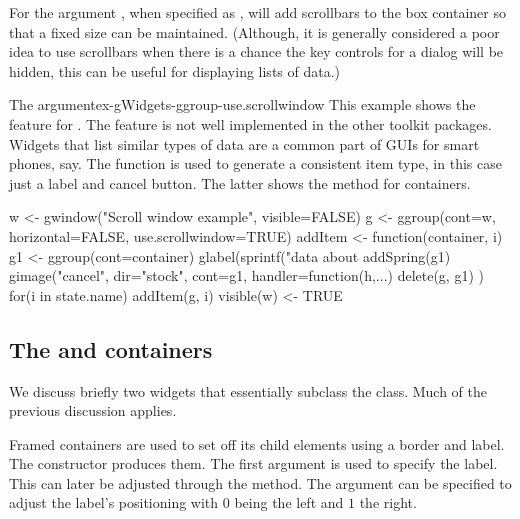 For  the argument
, when specified as , will
add scrollbars to the box container so that a fixed size can be
maintained. (Although, it is generally considered a poor idea to use
scrollbars when there is a chance the key controls for a dialog will
be hidden, this can be useful for displaying lists of data.)


\begin{example}{The  argument}{ex-gWidgets-ggroup-use.scrollwindow}
This example shows the  feature for
. The feature is not well implemented in the other
toolkit packages. Widgets that list similar types of data are a common
part of GUIs for smart phones, say. The  function is used to generate
a consistent item type, in this case just a label and cancel
button. The latter shows the  method for containers.

\begin{Schunk}
\begin{Sinput}
 w <- gwindow("Scroll window example", visible=FALSE)
 g <- ggroup(cont=w, horizontal=FALSE, use.scrollwindow=TRUE)
 addItem <- function(container, i) {
   g1 <- ggroup(cont=container)
   glabel(sprintf("data about %
   addSpring(g1)
   gimage("cancel", dir="stock", cont=g1, handler=function(h,...) {
     delete(g, g1)
   })
 }
 for(i in state.name) addItem(g, i)
 visible(w) <- TRUE
\end{Sinput}
\end{Schunk}
\end{example}




\subsection{The  and  containers}
\label{sec:gWidgets-decorated-cont}

We discuss briefly two widgets that essentially subclass the
 class. Much of the previous discussion applies.

Framed containers are used to set off its child elements using a
border and label. The  constructor produces
them. The first argument  is used to specify
the label. This can later be adjusted through the
 method. The argument
 can be specified to adjust the label's
positioning with $0$ being the left and $1$ the right.


